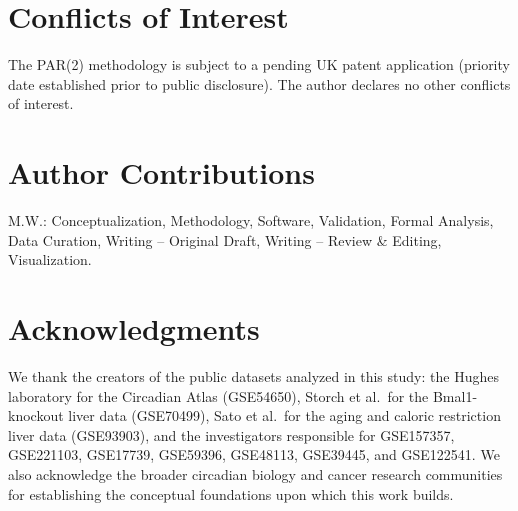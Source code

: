 \documentclass[11pt,a4paper]{article}
\begin{document}
\section*{Conflicts of Interest}

The PAR(2) methodology is subject to a pending UK patent application (priority date established prior to public disclosure). The author declares no other conflicts of interest.

\section*{Author Contributions}

M.W.: Conceptualization, Methodology, Software, Validation, Formal Analysis, Data Curation, Writing -- Original Draft, Writing -- Review \& Editing, Visualization.

\section*{Acknowledgments}

We thank the creators of the public datasets analyzed in this study: the Hughes laboratory for the Circadian Atlas (GSE54650), Storch et al.\ for the Bmal1-knockout liver data (GSE70499), Sato et al.\ for the aging and caloric restriction liver data (GSE93903), and the investigators responsible for GSE157357, GSE221103, GSE17739, GSE59396, GSE48113, GSE39445, and GSE122541. We also acknowledge the broader circadian biology and cancer research communities for establishing the conceptual foundations upon which this work builds.
\end{document}
